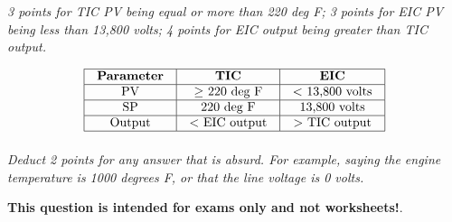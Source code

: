 
{\it 3 points for TIC PV being equal or more than 220 deg F; 3 points for EIC PV being less than 13,800 volts; 4 points for EIC output being greater than TIC output.}


$$\vbox{\offinterlineskip
\halign{\strut
\vrule \quad\hfil # \ \hfil & 
\vrule \quad\hfil # \ \hfil & 
\vrule \quad\hfil # \ \hfil \vrule \cr
\noalign{\hrule}
%
{\bf Parameter} & {\bf TIC} & {\bf EIC} \cr
%
\noalign{\hrule}
%
PV & $\geq$ 220 deg F & $<$ 13,800 volts  \cr
%
\noalign{\hrule}
%
SP & 220 deg F & 13,800 volts \cr
%
\noalign{\hrule}
%
Output & $<$ EIC output & $>$ TIC output \cr
%
\noalign{\hrule}
} %
}$$ %

{\it Deduct 2 points for any answer that is absurd.  For example, saying the engine temperature is 1000 degrees F, or that the line voltage is 0 volts.}







{\bf This question is intended for exams only and not worksheets!}.



